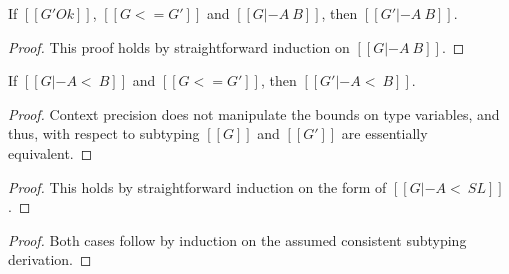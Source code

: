 \begin{lemma}
  \label{lemma:type_cons_ctx_pre}
  If $[[G' Ok]]$, $[[G <= G']]$ and $[[G |- A ~ B]]$, then $[[G' |- A ~ B]]$.
\end{lemma}
\begin{proof}
  This proof holds by straightforward induction on $[[G |- A ~ B]]$. 
\end{proof}

\begin{lemma}
  \label{lemma:subtyping_context_precision}
  If $[[G |- A <~ B]]$ and $[[G <= G']]$, then $[[G' |- A <~ B]]$.
\end{lemma}
\begin{proof}
  Context precision does not manipulate the bounds on type variables, and thus,
  with respect to subtyping $[[G]]$ and $[[G']]$ are essentially equivalent.
\end{proof}

\begin{proof}
  This holds by straightforward induction on the form of $[[G |- A <~ SL]]$.
\end{proof}

\begin{proof}
  Both cases follow by induction on the assumed consistent subtyping
  derivation.
\end{proof}

